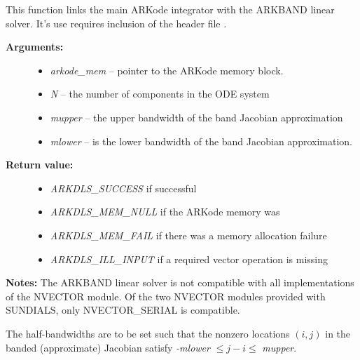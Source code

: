 \documentclass[letterpaper,10pt,english]{sphinxmanual}
\begin{document}
\begin{fulllineitems}
\label{c_interface/User_callable:ARKBand}
This function links the main ARKode integrator with the ARKBAND
linear solver.  It's use requires inclusion of the header file
.
\begin{description}
\item[{\textbf{Arguments:}}] \leavevmode\begin{itemize}
\item {} 
\emph{arkode\_mem} -- pointer to the ARKode memory block.

\item {} 
\emph{N} -- the number of components in the ODE system

\item {} 
\emph{mupper} -- the upper bandwidth of the band Jacobian approximation

\item {} 
\emph{mlower} -- is the lower bandwidth of the band Jacobian approximation.

\end{itemize}

\item[{\textbf{Return value:}}] \leavevmode\begin{itemize}
\item {} 
\emph{ARKDLS\_SUCCESS}   if successful

\item {} 
\emph{ARKDLS\_MEM\_NULL}  if the ARKode memory was 

\item {} 
\emph{ARKDLS\_MEM\_FAIL}  if there was a memory allocation failure

\item {} 
\emph{ARKDLS\_ILL\_INPUT} if a required vector operation is missing

\end{itemize}

\end{description}

\textbf{Notes:} The ARKBAND linear solver is not compatible with all
implementations of the NVECTOR module.  Of the two
NVECTOR modules provided with SUNDIALS, only
NVECTOR\_SERIAL is compatible.

The half-bandwidths are to be set such that the nonzero locations
$(i, j)$ in the banded (approximate) Jacobian satisfy \emph{-mlower}
$\le j-i \le$ \emph{mupper}.

\end{fulllineitems}
\end{document}
